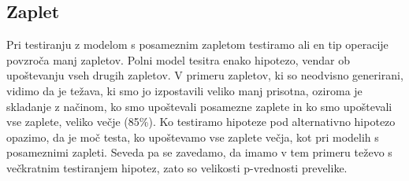 \documentclass[letterpaper,11pt]{article}
\begin{document}

\clearpage
\newpage
\subsection{Zaplet}
Pri testiranju z modelom s posameznim zapletom testiramo ali en tip operacije povzroča manj zapletov. Polni model tesitra enako hipotezo, vendar ob upoštevanju vseh drugih zapletov. V primeru zapletov, ki so neodvisno generirani, vidimo da je težava, ki smo jo izpostavili veliko manj prisotna, oziroma je skladanje z načinom, ko smo upoštevali posamezne zaplete in ko smo upoštevali vse zaplete, veliko večje (85\%). Ko testiramo hipoteze pod alternativno hipotezo opazimo, da je moč testa, ko upoštevamo vse zaplete večja, kot pri modelih s posameznimi zapleti. Seveda pa se zavedamo, da imamo v tem primeru teževo s večkratnim testiranjem hipotez, zato so velikosti p-vrednosti prevelike.
\end{document}
